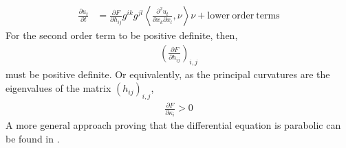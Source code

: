 %
\begin{align*}
	\frac{\partial u_t}{\partial t} &= \frac{\partial F}{\partial h_{i j}} g^{i k}g^{jl}\left\langle \frac{\partial^2 u_t}{\partial x_k\partial x_l} , \nu \right\rangle \nu+ \mathrm{lower \ order \ terms}
\end{align*}
For the second order term to be positive definite, then, 
\begin{align*}
	\left(\frac{\partial F}{\partial h_{i j}} \right)_{i, j}
\end{align*}
must be positive definite. Or equivalently, as the principal curvatures are the eigenvalues of the matrix $(h_{i j})_{i, j}$,
\begin{align*}
	\frac{\partial F}{\partial \kappa_{i}} > 0
\end{align*}
A more general approach proving that the differential equation is parabolic can be found in \cite{Gerhardt Curvature}. 

